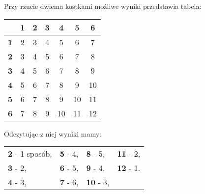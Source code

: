 \medskip
{} 
\medskip

Przy rzucie dwiema kostkami możliwe wyniki przedstawia tabela:\\
\begin{table}[htb]
\centering
\begin{tabular}{|c|c|c|c|c|c|c|}
\hline
 & \textbf{1} & \textbf{2} & \textbf{3} & \textbf{4} & \textbf{5} & \textbf{6} \\
\hline
\textbf{1} & 2 & 3 & 4 & 5 & 6 & 7 \\
\hline
\textbf{2} & 3 & 4 & 5 & 6 & 7 & 8 \\
\hline
\textbf{3} & 4 & 5 & 6 & 7 & 8 & 9 \\
\hline
\textbf{4} & 5 & 6 & 7 & 8 & 9 & 10 \\
\hline
\textbf{5} & 6 & 7 & 8 & 9 & 10 & 11 \\
\hline
\textbf{6} & 7 & 8 & 9 & 10 & 11 & 12 \\
\hline
\end{tabular}
\end{table}

Odczytując z niej wyniki mamy:\\

\begin{tabular}{llll}
\textbf{2} - 1 sposób, & \textbf{5} - 4, & \textbf{8} - 5, & \textbf{11} - 2, \\
\textbf{3} - 2, & \textbf{6} - 5, & \textbf{9} - 4, & \textbf{12} - 1. \\
\textbf{4} - 3, & \textbf{7} - 6, & \textbf{10} - 3, & \\
\end{tabular}
\\
\\
